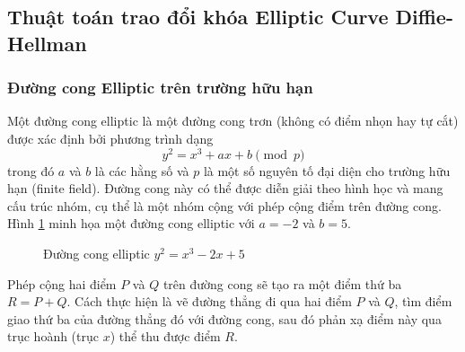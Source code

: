 \subsection{Thuật toán trao đổi khóa Elliptic Curve Diffie-Hellman}
\subsubsection{Đường cong Elliptic trên trường hữu hạn}
Một đường cong elliptic là một đường cong trơn (không có điểm nhọn hay tự cắt) được xác định bởi phương trình dạng
\[
    y^2 = x^3 + ax + b \pmod{p}
\]
trong đó $a$ và $b$ là các hằng số và $p$ là một số nguyên tố đại diện cho trường hữu hạn (finite field). Đường cong này có thể được diễn giải theo hình học và mang cấu trúc nhóm, cụ thể là một nhóm cộng với phép cộng điểm trên đường cong. Hình \ref{fig:curve} minh họa một đường cong elliptic với $a = -2$ và $b = 5$.


\begin{figure}[h]
    \centering
    \caption{Đường cong elliptic $y^2 = x^3 - 2x + 5$}
    \label{fig:curve}
\end{figure}

Phép cộng hai điểm $P$ và $Q$ trên đường cong sẽ tạo ra một điểm thứ ba $R = P + Q$. Cách thực hiện là vẽ đường thẳng đi qua hai điểm $P$ và $Q$, tìm điểm giao thứ ba của đường thẳng đó với đường cong, sau đó phản xạ điểm này qua trục hoành (trục $x$) thể thu được điểm $R$.

